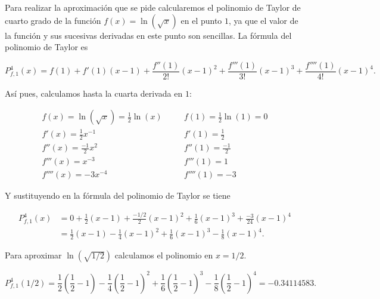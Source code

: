 \documentclass[
  spanish,
  a4paper,
]{scrreport}
\theoremstyle{definition}
\theoremstyle{remark}
\begin{document}
\begin{tcolorbox}[enhanced jigsaw, arc=.35mm, bottomrule=.15mm, bottomtitle=1mm, breakable, colback=white, colbacktitle=quarto-callout-tip-color!10!white, colframe=quarto-callout-tip-color-frame, coltitle=black, left=2mm, leftrule=.75mm, opacityback=0, opacitybacktitle=0.6, rightrule=.15mm, title=\textcolor{quarto-callout-tip-color}{\faLightbulb}\hspace{0.5em}{Solución}, titlerule=0mm, toprule=.15mm, toptitle=1mm]

Para realizar la aproximación que se pide calcularemos el polinomio de
Taylor de cuarto grado de la función \(f(x)=\ln(\sqrt{x})\) en el punto
\(1\), ya que el valor de la función y sus sucesivas derivadas en este
punto son sencillas. La fórmula del polinomio de Taylor es

\[
P_{f,1}^4(x) = f(1)+f'(1)(x-1)+\frac{f''(1)}{2!}(x-1)^2+\frac{f'''(1)}{3!}(x-1)^3+\frac{f''''(1)}{4!}(x-1)^4.
\]

Así pues, calculamos hasta la cuarta derivada en \(1\):

\[\renewcommand{\arraystretch}{1.5} 
\begin{array}{lll}
f(x)=\ln(\sqrt{x})=\frac{1}{2}\ln(x) & \quad & f(1) = \frac{1}{2}\ln(1) = 0\\
f'(x) = \frac{1}{2}x^{-1} & & f'(1) = \frac{1}{2}\\
f''(x) = \frac{-1}{2}x^{2} & & f''(1) = \frac{-1}{2}\\
f'''(x) = x^{-3} & & f'''(1) = 1\\
f''''(x) = -3x^{-4} & & f''''(1) = -3
\end{array}
\]

Y sustituyendo en la fórmula del polinomio de Taylor se tiene

\[
\begin{aligned} 
P_{f,1}^4(x) &= 0+\frac{1}{2}(x-1)+\frac{-1/2}{2}(x-1)^2+\frac{1}{6}(x-1)^3+\frac{-3}{24}(x-1)^4\\
&= \frac{1}{2}(x-1)-\frac{1}{4}(x-1)^2+\frac{1}{6}(x-1)^3-\frac{1}{8}(x-1)^4. \end{aligned}
\]

Para aproximar \(\ln(\sqrt{1/2})\) calculamos el polinomio en \(x=1/2\).

\[
P_{f,1}^4(1/2) = \frac{1}{2}\left(\frac{1}{2}-1\right)-\frac{1}{4}\left(\frac{1}{2}-1\right)^2+\frac{1}{6}\left(\frac{1}{2}-1\right)^3-\frac{1}{8}\left(\frac{1}{2}-1\right)^4 = -0.34114583.
\]

\end{tcolorbox}
\end{document}
